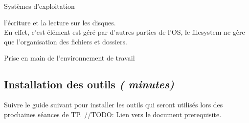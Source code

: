 \begin{section}{Systèmes d'exploitation}
    \begin{solution}
        l'écriture et la lecture sur les disques. \\
	
	En effet, c'est élément est géré par d'autres parties de l'OS, le filesystem ne gère que l'organisation des fichiers et dossiers. \\ 
    \end{solution}
    
\end{section}

\begin{section}{Prise en main de l'environnement de travail}
    \subsection{Installation des outils \textit{(\faClock {} minutes)}} 
        Suivre le guide suivant pour installer les outils qui seront utilisés lors des prochaines séances de TP. //TODO: Lien vers le document prerequisite.
\end{section}

